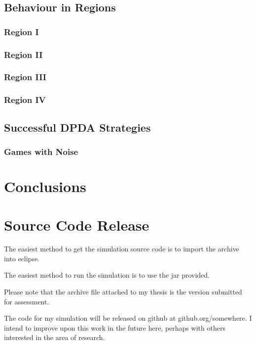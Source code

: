 \documentclass[a4paper,11pt,bcshonoursthesis,singlespace,twoside,thesisdraft,pdflatex]{cssethesis}
\begin{document}
\section{Behaviour in Regions}
\subsection{Region I}
\subsection{Region II}
\subsection{Region III}
\subsection{Region IV}
\section{Successful DPDA Strategies}
\subsection{Games with Noise}
\chapter{Conclusions}

\appendix %

\chapter{Source Code Release}
\label{app:code}
The easiest method to get the simulation source code is to import the archive into eclipse.

The easiest method to run the simulation is to use the jar provided. 

Please note that the archive file attached to my thesis is the version submitted for assessment. 

The code for my simulation will be released on github at github.org/somewhere. 
I intend to improve upon this work in the future here, perhaps with others interested in the area of research. 
\end{document}
